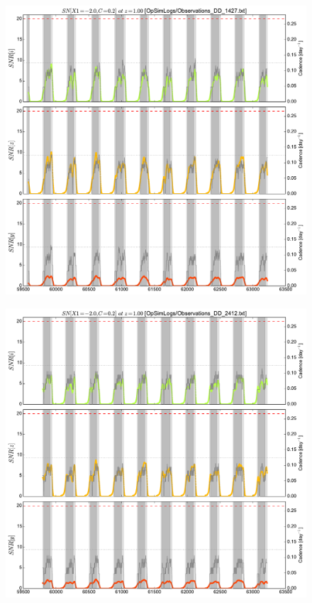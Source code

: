 \documentclass[\docopts]{\docclass}
\begin{document}
\begin{figure}[t]
  \begin{center}
    \includegraphics[width=\linewidth]{metric_DD_1427.pdf}
    \caption{}
  \end{center}
\end{figure}

\begin{figure}[t]
  \begin{center}
    \includegraphics[width=\linewidth]{metric_DD_2412.pdf}
    \caption{}
  \end{center}
\end{figure}
\end{document}
